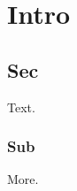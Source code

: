 \documentclass{ws-rv9x6}
\begin{document}
\chapter{Intro}
\section{Sec}
Text.
\subsection{Sub}
More.
\end{document}
